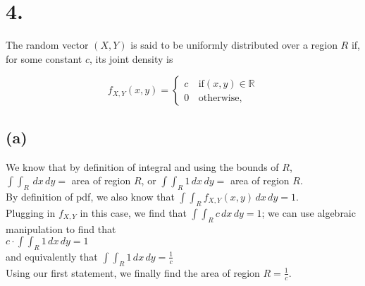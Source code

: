 \documentclass{article}
\begin{document}
\section*{4.}
{\Large 
The random vector $(X, Y)$ is said to be uniformly distributed over a region $R$ if, for some
constant $c$, its joint density is

\[
f_{X,Y}\left(x,y\right)=\begin{cases}
c& \,\mbox{if} \left(x,y\right)\in\mathbb R\\
0 & \,\mbox{otherwise,}
\end{cases}
\]

\subsection*{(a)}
We know that by definition of integral and using the bounds of $R$, \\
$\int \int_{R} \,dx \,dy = $ area of region $R$, or $\int \int_{R} 1 \,dx \,dy = $ area of region $R$. \\ 
By definition of pdf, we also know that $\int \int_{R} f_{X, Y} (x, y) \,dx \,dy = 1$. \\
Plugging in $f_{X, Y}$ in this case, we find that $\int \int_{R} c \,dx \,dy = 1$; we can use algebraic manipulation to find that \\ 
$c \cdot \int \int_{R} 1 \,dx \,dy = 1$ \\ 
and equivalently that $\int \int_{R} 1 \,dx \,dy = \frac{1}{c}$ \\
Using our first statement, we finally find the area of region $R = \frac{1}{c}$.

}
\end{document}
